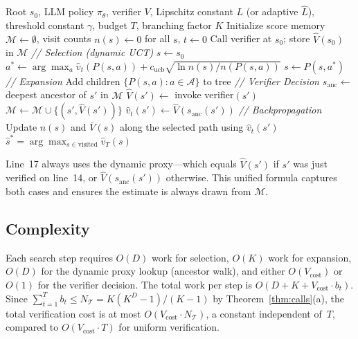 \begin{algorithm}[t]
\caption{DVA-MCTS}
\label{alg:dva}
\begin{algorithmic}[1]
\Require Root $s_0$, LLM policy $\pi_\theta$, verifier $V$,
         Lipschitz constant $L$ (or adaptive $\hat{L}$), threshold constant $\gamma$,
         budget $T$, branching factor $K$
\State Initialize score memory $\mathcal{M} \leftarrow \emptyset$,
       visit counts $n(s) \leftarrow 0$ for all $s$, $t \leftarrow 0$
\State Call verifier at $s_0$; store $\hat{V}(s_0)$ in $\mathcal{M}$
  \State \textit{// Selection (dynamic UCT)}
  \State $s \leftarrow s_0$
    \State $a^* \leftarrow \arg\max_{a} \hat{v}_t(P(s,a)) + c_{\text{ucb}}\sqrt{\ln n(s) / n(P(s,a))}$
    \State $s \leftarrow P(s, a^*)$
  \EndWhile
  \State \textit{// Expansion}
    \State Add children $\{P(s, a) : a \in \mathcal{A}\}$ to tree
  \EndIf
  \State \textit{// Verifier Decision}
    \State $s_{\mathrm{anc}} \leftarrow$ deepest ancestor of $s'$ in $\mathcal{M}$
      \State $\hat{V}(s') \leftarrow$ invoke verifier$(s')$
      \State $\mathcal{M} \leftarrow \mathcal{M} \cup \{(s', \hat{V}(s'))\}$
    \EndIf
    \State $\hat{v}_t(s') \leftarrow \hat{V}(s_{\mathrm{anc}}(s'))$
  \EndFor
  \State \textit{// Backpropagation}
  \State Update $n(s)$ and $\bar{V}(s)$ along the selected path using $\hat{v}_t(s')$
\EndWhile
\State \Return $\hat{s}^* = \arg\max_{s \in \text{visited}} \hat{v}_T(s)$
\end{algorithmic}
\end{algorithm}

\begin{remark}
Line~17 always uses the dynamic proxy---which equals $\hat{V}(s')$ if $s'$ was just
verified on line~14, or $\hat{V}(s_{\mathrm{anc}}(s'))$ otherwise.  This unified
formula captures both cases and ensures the estimate is always drawn from $\mathcal{M}$.
\end{remark}

\subsection{Complexity}

Each search step requires $O(D)$ work for selection, $O(K)$ work for expansion,
$O(D)$ for the dynamic proxy lookup (ancestor walk), and either
$O(V_{\text{cost}})$ or $O(1)$ for the verifier decision.
The total work per step is $O(D + K + V_{\text{cost}} \cdot b_t)$. Since
$\sum_{t=1}^T b_t \leq N_{\mathcal{T}} = K(K^D-1)/(K-1)$ by Theorem~\ref{thm:calls}(a),
the total verification cost is at most $O(V_{\text{cost}} \cdot N_{\mathcal{T}})$, a constant
independent of~$T$, compared to $O(V_{\text{cost}} \cdot T)$ for uniform verification.
